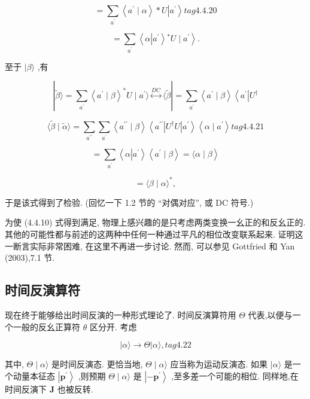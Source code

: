 $$
= \mathop{\sum }\limits_{{a}^{\prime }}\left\langle {{a}^{\prime } \mid \alpha }\right\rangle * U\left| {a}^{\prime }\right\rangle tag{4. 4.20}
$$

$$
= \mathop{\sum }\limits_{{a}^{\prime }}\left\langle {\alpha \left| {a}^{\prime }\right\rangle {}^{ * }U \mid {a}^{\prime }}\right\rangle .
$$

至于 $|\beta \rangle$ ,有

$$
\left| {\widetilde{\beta }\rangle = \mathop{\sum }\limits_{{a}^{\prime }}{\left\langle {a}^{\prime } \mid \beta \right\rangle }^{ * }U \mid {a}^{\prime }\rangle \overset{DC}{ \leftrightarrow }\langle \widetilde{\beta }}\right| = \mathop{\sum }\limits_{{a}^{\prime }}\left\langle {{a}^{\prime } \mid \beta }\right\rangle \left\langle {a}^{\prime }\right| {U}^{ \dagger }
$$

$$
\langle \widetilde{\beta } \mid \widetilde{\alpha }\rangle = \mathop{\sum }\limits_{{a}^{\prime \prime }}\mathop{\sum }\limits_{{a}^{\prime }}\left\langle {{a}^{\prime \prime } \mid \beta }\right\rangle \left\langle {{a}^{\prime \prime }\left| {{U}^{ \dagger }U}\right| {a}^{\prime }}\right\rangle \left\langle {\alpha \mid {a}^{\prime }}\right\rangle tag{4. 4.21}
$$

$$
= \mathop{\sum }\limits_{{a}^{\prime }}\left\langle {\alpha \left| {a}^{\prime }\right\rangle \left\langle {{a}^{\prime } \mid \beta }\right\rangle = \langle \alpha \mid \beta }\right\rangle
$$

$$
= \langle \beta \mid \alpha {\rangle }^{ * },
$$

于是该式得到了检验. (回忆一下 1.2 节的 “对偶对应”, 或 DC 符号.)

为使 (4.4.10) 式得到满足, 物理上感兴趣的是只考虑两类变换一幺正的和反幺正的. 其他的可能性都与前述的这两种中任何一种通过平凡的相位改变联系起来. 证明这一断言实际非常困难, 在这里不再进一步讨论. 然而, 可以参见 Gottfried 和 Yan (2003),7.1 节.

\subsection{时间反演算符}

现在终于能够给出时间反演的一种形式理论了. 时间反演算符用 $\Theta$ 代表,以便与一个一般的反幺正算符 $\theta$ 区分开. 考虑

$$
\left| {\alpha \rangle \rightarrow \Theta }\right| \alpha \rangle , tag{4. 2 2}
$$

其中, $\Theta \mid \alpha \rangle$ 是时间反演态. 更恰当地, $\Theta \mid \alpha \rangle$ 应当称为运动反演态. 如果 $|\alpha \rangle$ 是一个动量本征态 $\left| {\mathbf{p}}^{\prime }\right\rangle$ ,则预期 $\Theta \mid \alpha \rangle$ 是 $\left| {-{\mathbf{p}}^{\prime }}\right\rangle$ ,至多差一个可能的相位. 同样地,在时间反演下 $\mathbf{J}$ 也被反转.



